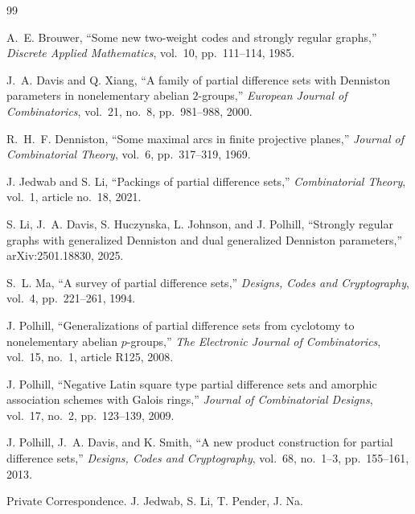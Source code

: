 \documentclass[11pt]{article}
\theoremstyle{definition}
\theoremstyle{remark}
\begin{document}
\endgroup


\begin{thebibliography}{99}

A.~E. Brouwer,
``Some new two-weight codes and strongly regular graphs,''
\emph{Discrete Applied Mathematics},
vol.~10,
pp.~111--114,
1985.

J.~A. Davis and Q. Xiang,
``A family of partial difference sets with Denniston parameters in
nonelementary abelian \(2\)-groups,''
\emph{European Journal of Combinatorics},
vol.~21,
no.~8,
pp.~981--988,
2000.

R.~H.~F. Denniston,
``Some maximal arcs in finite projective planes,''
\emph{Journal of Combinatorial Theory},
vol.~6,
pp.~317--319,
1969.

J. Jedwab and S. Li,
``Packings of partial difference sets,''
\emph{Combinatorial Theory},
vol.~1,
article no.~18,
2021.

S. Li,
J.~A. Davis,
S. Huczynska,
L. Johnson,
and J. Polhill,
``Strongly regular graphs with generalized Denniston and dual
generalized Denniston parameters,''
arXiv:2501.18830,
2025.

S.~L. Ma,
``A survey of partial difference sets,''
\emph{Designs, Codes and Cryptography},
vol.~4,
pp.~221--261,
1994.

J. Polhill,
``Generalizations of partial difference sets from cyclotomy to
nonelementary abelian \(p\)-groups,''
\emph{The Electronic Journal of Combinatorics},
vol.~15,
no.~1,
article R125,
2008.

J. Polhill,
``Negative Latin square type partial difference sets and amorphic
association schemes with Galois rings,''
\emph{Journal of Combinatorial Designs},
vol.~17,
no.~2,
pp.~123--139,
2009.

J. Polhill,
J.~A. Davis,
and K. Smith,
``A new product construction for partial difference sets,''
\emph{Designs, Codes and Cryptography},
vol.~68,
no.~1--3,
pp.~155--161,
2013.


Private Correspondence. J. Jedwab, S. Li, T. Pender, J. Na. 




\end{thebibliography}
\end{document}
